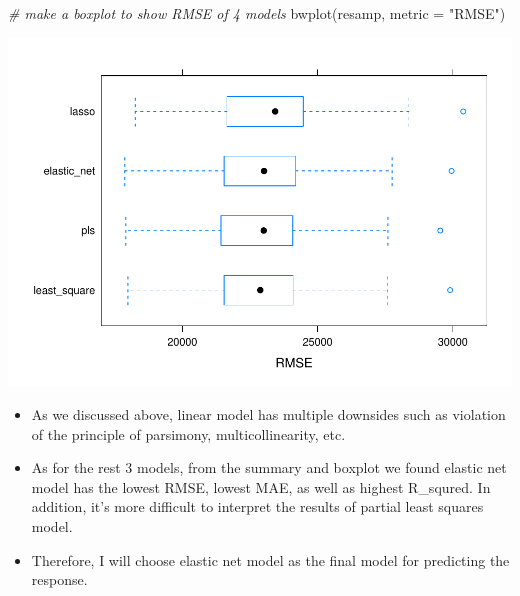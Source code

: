 \documentclass[
]{article}
\newenvironment{Shaded}{\begin{snugshade}}{\end{snugshade}}
\newcommand{\AttributeTok}[1]{\textcolor[rgb]{0.77,0.63,0.00}{#1}}
\newcommand{\CommentTok}[1]{\textcolor[rgb]{0.56,0.35,0.01}{\textit{#1}}}
\newcommand{\FunctionTok}[1]{\textcolor[rgb]{0.00,0.00,0.00}{#1}}
\newcommand{\NormalTok}[1]{#1}
\newcommand{\StringTok}[1]{\textcolor[rgb]{0.31,0.60,0.02}{#1}}
\begin{document}
\begin{Shaded}
\begin{Highlighting}[]
\CommentTok{\# make a boxplot to show RMSE of 4 models}
\FunctionTok{bwplot}\NormalTok{(resamp, }\AttributeTok{metric =} \StringTok{"RMSE"}\NormalTok{)}
\end{Highlighting}
\end{Shaded}

\includegraphics{p8106_hw1_qz2266_final_files/figure-latex/boxplot-1.pdf}

\begin{itemize}
\item
  As we discussed above, linear model has multiple downsides such as
  violation of the principle of parsimony, multicollinearity, etc.
\item
  As for the rest 3 models, from the summary and boxplot we found
  elastic net model has the lowest RMSE, lowest MAE, as well as highest
  R\_squred. In addition, it's more difficult to interpret the results
  of partial least squares model.
\item
  Therefore, I will choose elastic net model as the final model for
  predicting the response.
\end{itemize}
\end{document}
